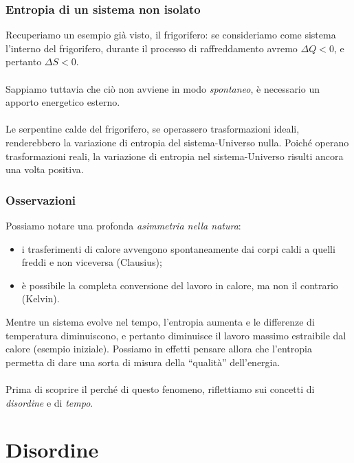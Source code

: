 \documentclass[]{beamer}
\theoremstyle{plain}
\begin{document}
\begin{frame}
\frametitle{Entropia di un sistema non isolato}
Recuperiamo un esempio già visto, il frigorifero: se consideriamo come sistema l'interno del frigorifero, durante il processo di raffreddamento avremo $ \Delta Q < 0  $, e pertanto $ \Delta S < 0 $.\\~\pause\\
Sappiamo tuttavia che ciò non avviene in modo \emph{spontaneo}, è necessario un apporto energetico esterno.\\~\pause\\Le serpentine calde del frigorifero, se operassero trasformazioni ideali, renderebbero la variazione di entropia del sistema-Universo nulla. Poiché operano trasformazioni reali, la variazione di entropia nel sistema-Universo risulti ancora una volta positiva.
\end{frame}


\begin{frame}
  \frametitle{Osservazioni}
  Possiamo notare una profonda \emph{asimmetria nella natura}:
  \begin{itemize}
    \item i trasferimenti di calore avvengono spontaneamente dai corpi caldi a quelli freddi e non viceversa (Clausius);
    \item è possibile la completa conversione del lavoro in calore, ma non il contrario (Kelvin).
  \end{itemize}\pause
Mentre un sistema evolve nel tempo, l'entropia aumenta e le differenze di temperatura diminuiscono, e pertanto diminuisce il lavoro massimo estraibile dal calore (esempio iniziale). Possiamo in effetti pensare allora che l'entropia permetta di dare una sorta di misura della ``qualità'' dell'energia.\\\pause~\\
Prima di scoprire il perché di questo fenomeno, riflettiamo sui concetti di \emph{disordine} e di \emph{tempo}.
\end{frame}



\section{Disordine}
\end{document}
